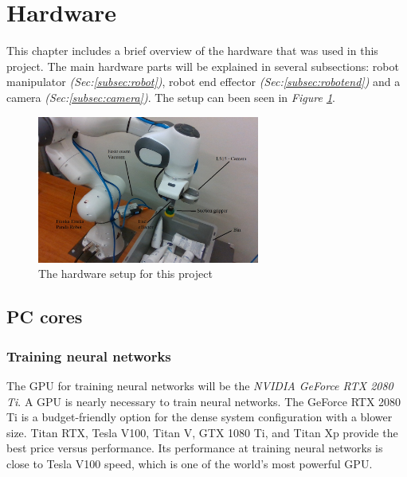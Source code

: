 \clearpage
\section{Hardware \label{sec:hardware}}
This chapter includes a brief overview of the hardware that was used in this project. The main hardware parts will be explained in several subsections: robot manipulator \textit{(Sec:\ref{subsec:robot})}, robot end effector \textit{(Sec:\ref{subsec:robotend})} and a camera \textit{(Sec:\ref{subsec:camera})}. The setup can been seen in \textit{Figure \ref{fig:setupproject}}.

\begin{figure}[h]
    \centering
    \includegraphics[width = 0.65\textwidth]{graphics/setup.jpg}
    \caption{The hardware setup for this project}
    \label{fig:setupproject}
\end{figure}
\linespread{0}
\subsection{PC cores}
\vspace{0.8cm}
\subsubsection*{Training neural networks}
The GPU for training neural networks will be the \textit{NVIDIA GeForce RTX 2080 Ti}\cite{noauthor_graphics_nodate}.
A GPU is nearly necessary to train neural networks. The GeForce RTX 2080 Ti is a budget-friendly option for the dense system configuration with a blower size. Titan RTX, Tesla V100, Titan V, GTX 1080 Ti, and Titan Xp provide the best price versus performance. Its performance at training neural networks is close to Tesla V100 speed, which is one of the world's most powerful GPU\cite{balaban_deep_2018}. 

